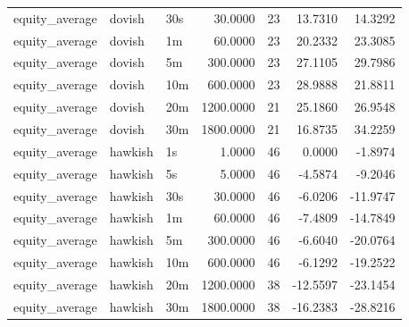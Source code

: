 \begin{tabular}{lllrrrr}
equity_average & dovish & 30s & 30.0000 & 23 & 13.7310 & 14.3292 \\
equity_average & dovish & 1m & 60.0000 & 23 & 20.2332 & 23.3085 \\
equity_average & dovish & 5m & 300.0000 & 23 & 27.1105 & 29.7986 \\
equity_average & dovish & 10m & 600.0000 & 23 & 28.9888 & 21.8811 \\
equity_average & dovish & 20m & 1200.0000 & 21 & 25.1860 & 26.9548 \\
equity_average & dovish & 30m & 1800.0000 & 21 & 16.8735 & 34.2259 \\
equity_average & hawkish & 1s & 1.0000 & 46 & 0.0000 & -1.8974 \\
equity_average & hawkish & 5s & 5.0000 & 46 & -4.5874 & -9.2046 \\
equity_average & hawkish & 30s & 30.0000 & 46 & -6.0206 & -11.9747 \\
equity_average & hawkish & 1m & 60.0000 & 46 & -7.4809 & -14.7849 \\
equity_average & hawkish & 5m & 300.0000 & 46 & -6.6040 & -20.0764 \\
equity_average & hawkish & 10m & 600.0000 & 46 & -6.1292 & -19.2522 \\
equity_average & hawkish & 20m & 1200.0000 & 38 & -12.5597 & -23.1454 \\
equity_average & hawkish & 30m & 1800.0000 & 38 & -16.2383 & -28.8216 \\
\bottomrule
\end{tabular}
